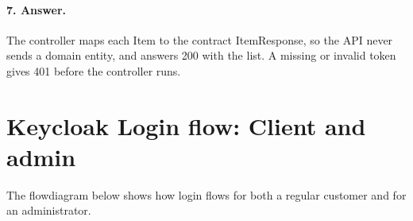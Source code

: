 \documentclass[a4paper,11pt]{article}
\begin{document}
\paragraph{7. Answer.} The controller maps each Item to the contract ItemResponse, so the API never sends a domain entity, and answers 200 with the list. A missing or invalid token gives 401 before the controller runs.

\section{Keycloak Login flow: Client and admin}

The flowdiagram below shows how login flows for both a regular customer and for an administrator.

\end{document}
